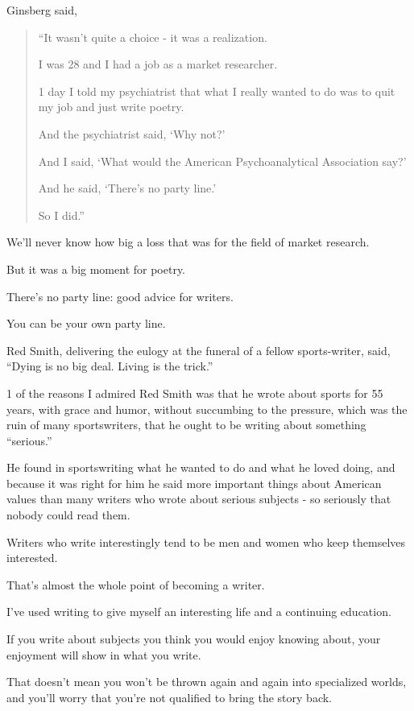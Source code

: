 \documentclass{book}
\numberwithin{equation}{section}
\begin{document}
Ginsberg said,
\begin{quotation}
    ``It wasn't quite a choice - it was a realization.
    
    I was 28 and I had a job as a market researcher.
    
    1 day I told my psychiatrist that what I really wanted to do was to quit my job and just write poetry.
    
    And the psychiatrist said, `Why not?'
    
    And I said, `What would the American Psychoanalytical Association say?'
    
    And he said, `There's no party line.'
    
    So I did.''
\end{quotation}
%
We'll never know how big a loss that was for the field of market research.

But it was a big moment for poetry.

There's no party line: good advice for writers.

You can be your own party line.

Red Smith, delivering the eulogy at the funeral of a fellow sports-writer, said, ``Dying is no big deal. Living is the trick.''

1 of the reasons I admired Red Smith was that he wrote about sports for 55 years, with grace and humor, without succumbing to the pressure, which was the ruin of many sportswriters, that he ought to be writing about something ``serious.''

He found in sportswriting what he wanted to do and what he loved doing, and because it was right for him he said more important things about American values than many writers who wrote about serious subjects - so seriously that nobody could read them.

%

Writers who write interestingly tend to be men and women who keep themselves interested.

That's almost the whole point of becoming a writer.

I've used writing to give myself an interesting life and a continuing education.

If you write about subjects you think you would enjoy knowing about, your enjoyment will show in what you write.


That doesn't mean you won't be thrown again and again into specialized worlds, and you'll worry that you're not qualified to bring the story back.
\end{document}
